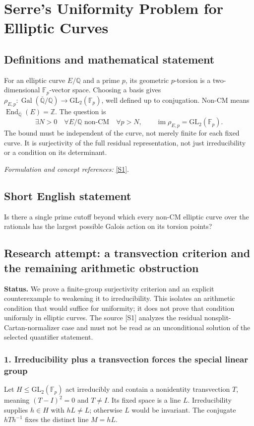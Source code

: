 \documentclass[11pt]{article}
\begin{document}
\section*{\texorpdfstring{Serre's Uniformity Problem for Elliptic Curves}{Serre's Uniformity Problem for Elliptic Curves}}\label{statement}
\subsection{Definitions and mathematical statement}
For an elliptic curve $E/{\mathbb{Q}}$ and a prime $p$, its geometric $p$-torsion is a two-dimensional ${\mathbb{F}}_p$-vector space. Choosing a basis gives
$\rho_{E,p}:\operatorname{Gal}(\overline{{\mathbb{Q}}}/{\mathbb{Q}})\to\mathrm{GL}_2({\mathbb{F}}_p)$, well defined up to conjugation. Non-CM means $\operatorname{End}_{\overline{{\mathbb{Q}}}}(E)={\mathbb{Z}}$. The question is
\[
 \exists N>0\quad\forall E/{\mathbb{Q}}\text{ non-CM}\quad\forall p>N,
 \qquad\operatorname{im}\rho_{E,p}=\mathrm{GL}_2({\mathbb{F}}_p).
\]
The bound must be independent of the curve, not merely finite for each fixed curve. It is surjectivity of the full residual representation, not just irreducibility or a condition on its determinant.
\par\smallskip\textit{Formulation and concept references:} \href{https://arxiv.org/abs/2305.17780}{[S1]}.

\subsection{Short English statement}
Is there a single prime cutoff beyond which every non-CM elliptic curve over the rationals has the largest possible Galois action on its torsion points?
\subsection{Research attempt: a transvection criterion and the remaining arithmetic obstruction}
\textbf{Status.} We prove a finite-group surjectivity criterion and an explicit counterexample to weakening it to irreducibility. This isolates an arithmetic condition that would suffice for uniformity; it does not prove that condition uniformly in elliptic curves. The source [S1] analyzes the residual nonsplit-Cartan-normalizer case and must not be read as an unconditional solution of the selected quantifier statement.

\subsubsection{1. Irreducibility plus a transvection forces the special linear group}
Let $H\le\mathrm{GL}_2(\mathbb F_p)$ act irreducibly and contain a nonidentity transvection $T$, meaning $(T-I)^2=0$ and $T\ne I$. Its fixed space is a line $L$. Irreducibility supplies $h\in H$ with $hL\ne L$; otherwise $L$ would be invariant. The conjugate $hTh^{-1}$ fixes the distinct line $M=hL$.
\end{document}
